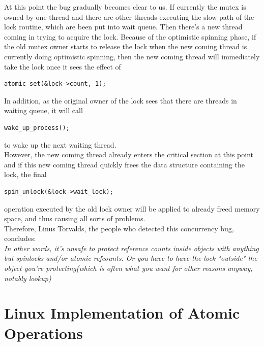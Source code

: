\documentclass[10pt]{sigplanconf}
\begin{document}
\noindent At this point the bug gradually becomes clear to us. If currently the mutex is owned by one thread and there are other threads executing the slow path of the lock routine, which are been put into wait queue. Then there's a new thread coming in trying to acquire the lock. Because of the optimistic spinning phase, if the old mutex owner starts to release the lock when the new coming thread is currently doing optimistic spinning, then the new coming thread will immediately take the lock once it sees the effect of 
\vspace{10pt}
\begin{lstlisting}
atomic_set(&lock->count, 1);
\end{lstlisting}
\vspace{10pt}

\noindent In addition, as the original owner of the lock sees that there are threads in waiting queue, it will call
\vspace{10pt}
\begin{lstlisting}
wake_up_process(); 
\end{lstlisting}
\vspace{10pt}

\noindent to wake up the next waiting thread. \\
\noindent However, the new coming thread already enters the critical section at this point and if this new coming thread quickly frees the data structure containing the lock, the final 
\vspace{10pt}
\begin{lstlisting}
spin_unlock(&lock->wait_lock);
\end{lstlisting}
\vspace{10pt}

\noindent operation executed by the old lock owner will be applied to already freed memory space, and thus causing all sorts of problems. \\
Therefore, Linus Torvalds, the people who detected this concurrency bug, concludes:\\

\textit{In other words, it's unsafe to protect reference counts inside objects with anything but spinlocks and/or atomic refcounts. Or you have to have the lock "outside" the object you're protecting(which is often what you want for other reasons anyway, notably lookup)}\\

\vspace{50pt}

\section{Linux Implementation of Atomic Operations}
\end{document}
